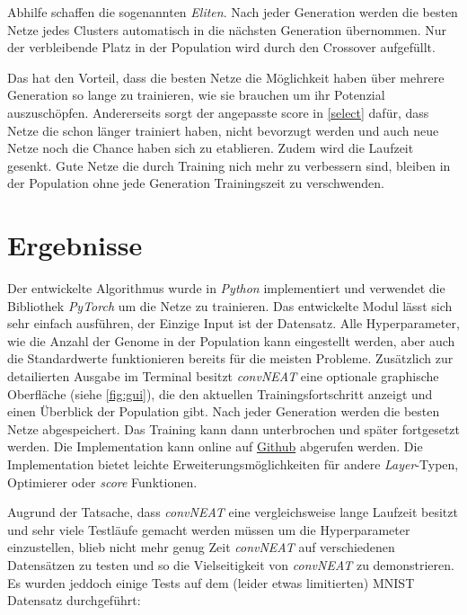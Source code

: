 \documentclass[]{scrartcl}
\begin{document}
			Abhilfe schaffen die sogenannten \textit{Eliten}. Nach jeder Generation werden die besten Netze jedes Clusters automatisch in die nächsten Generation übernommen.
			Nur der verbleibende Platz in der Population wird durch den Crossover aufgefüllt.

			Das hat den Vorteil, dass die besten Netze die Möglichkeit haben über mehrere Generation so lange zu trainieren, wie sie brauchen um ihr Potenzial auszuschöpfen.
			Andererseits sorgt der angepasste score in \ref{select} dafür, dass Netze die schon länger trainiert haben, nicht bevorzugt werden und auch neue Netze noch die Chance haben
			sich zu etablieren. Zudem wird die Laufzeit gesenkt. Gute Netze die durch Training nich mehr zu verbessern sind, bleiben in der Population ohne jede Generation
			Trainingszeit zu verschwenden.
	
	\clearpage

	\section{Ergebnisse}\label{ergeb}
		
		Der entwickelte Algorithmus wurde in \textit{Python} implementiert und verwendet die Bibliothek \textit{PyTorch} um die Netze zu trainieren.
		Das entwickelte Modul lässt sich sehr einfach ausführen, der Einzige Input ist der Datensatz. 
		Alle Hyperparameter, wie die Anzahl der Genome in der Population kann eingestellt werden, aber auch die Standardwerte funktionieren bereits für die meisten Probleme.
		Zusätzlich zur detailierten Ausgabe im Terminal besitzt \textit{convNEAT} eine optionale graphische Oberfläche (siehe \ref{fig:gui}), die den aktuellen Trainingsfortschritt anzeigt und einen Überblick der Population gibt.
		Nach jeder Generation werden die besten Netze abgespeichert. Das Training kann dann unterbrochen und später fortgesetzt werden.
		Die Implementation kann online auf \href{https://github.com/Jukamala/convNEAT}{Github} abgerufen werden.
		Die Implementation bietet leichte Erweiterungsmöglichkeiten für andere \textit{Layer}-Typen, Optimierer oder \textit{score} Funktionen.

		Augrund der Tatsache, dass \textit{convNEAT} eine vergleichsweise lange Laufzeit besitzt und sehr viele Testläufe gemacht werden müssen um die Hyperparameter einzustellen, blieb nicht mehr genug Zeit
		\textit{convNEAT} auf verschiedenen Datensätzen zu testen und so die Vielseitigkeit von \textit{convNEAT} zu demonstrieren.
		Es wurden jeddoch einige Tests auf dem (leider etwas limitierten) MNIST Datensatz durchgeführt:
\end{document}
